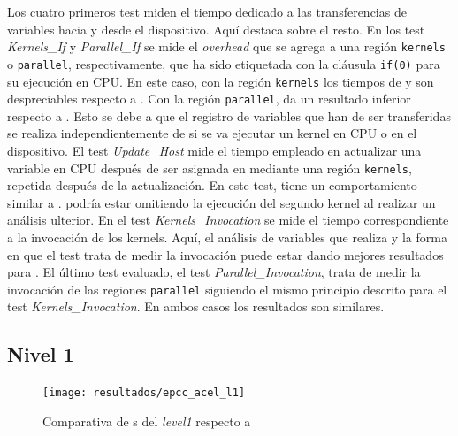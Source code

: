 Los cuatro primeros test miden el tiempo dedicado a las transferencias
de variables hacia y desde el dispositivo. 
Aquí \accULL{} destaca sobre el resto. 
En los test \textit{Kernels\_If} y \textit{Parallel\_If} se mide el \textit{overhead} que 
se agrega a una 
región \texttt{kernels} o \texttt{parallel}, respectivamente, que ha sido etiquetada con 
la cláusula \texttt{if(0)} para su ejecución en CPU. 
En este caso, con la región \texttt{kernels} los tiempos de \CAPS{} y 
\accULL{} son despreciables respecto a \PGI{}. 
Con la región \texttt{parallel},
\accULL{} da un resultado inferior respecto a \PGI{}. Esto se debe a que el registro 
de variables que han de ser transferidas se realiza independientemente de si se va 
ejecutar un kernel en CPU o en el dispositivo.
El test \textit{Update\_Host} mide el tiempo empleado en actualizar una variable en CPU 
después de ser asignada en \GPU{} mediante una región \texttt{kernels}, repetida después 
de la actualización.
En este test, \accULL{} tiene un comportamiento similar a \CAPS{}. \PGI{} podría estar 
omitiendo la ejecución del segundo kernel al realizar un análisis ulterior.
En el test \textit{Kernels\_Invocation} se mide el tiempo correspondiente a 
la invocación de los kernels.
Aquí, el análisis de variables que realiza \accULL{} y la forma en que el test trata de 
medir la invocación puede estar dando mejores resultados para \PGI{}. %
El último test evaluado, el test \textit{Parallel\_Invocation}, trata de medir la 
invocación de las 
regiones \texttt{parallel} siguiendo el mismo principio descrito para el test 
\textit{Kernels\_Invocation}. En ambos casos los resultados son similares.

\subsection{Nivel 1}

\begin{figure}[h]
   \centering
   \texttt{[image: resultados/epcc\_acel\_l1]}
   \caption{Comparativa de \benchmark{}s del \textit{level1} respecto a \PGI{}}
   \label{fig:epcc_acel_level1}
\end{figure}


